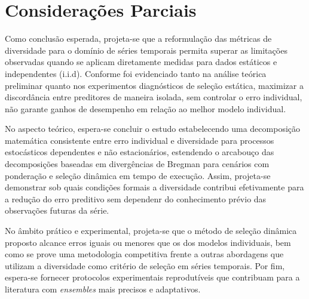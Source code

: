 \chapter{Considerações Parciais}

Como conclusão esperada, projeta-se que a reformulação das métricas de diversidade para o domínio de séries temporais permita superar as limitações observadas quando se aplicam diretamente medidas para dados estáticos e independentes (i.i.d). Conforme foi evidenciado tanto na análise teórica preliminar quanto nos experimentos diagnósticos de seleção estática, maximizar a discordância entre preditores de maneira isolada, sem controlar o erro individual, não garante ganhos de desempenho em relação ao melhor modelo individual. 

No aspecto teórico, espera-se concluir o estudo estabelecendo uma decomposição matemática consistente entre erro individual e diversidade para processos estocásticos dependentes e não estacionários, estendendo o arcabouço das decomposições baseadas em divergências de Bregman para cenários com ponderação e seleção dinâmica em tempo de execução. Assim, projeta-se demonstrar sob quais condições formais a diversidade contribui efetivamente para a redução do erro preditivo sem dependenr do conhecimento prévio das observações futuras da série.

No âmbito prático e experimental, projeta-se que o método de seleção dinâmica proposto alcance erros iguais ou menores que os dos modelos individuais, bem como se prove uma metodologia competitiva frente a outras abordagens que utilizam a diversidade como critério de seleção em séries temporais. Por fim, espera-se fornecer protocolos experimentais reprodutíveis que contribuam para a literatura com \textit{ensembles} mais precisos e adaptativos.